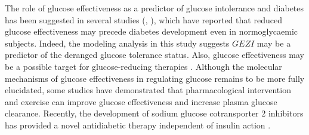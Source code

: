 \documentclass[utf8]{frontiersSCNS} %
\begin{document}
The role of glucose effectiveness as a predictor of glucose intolerance and diabetes has been suggested in several studies (\citet{Martin1992}, \citet{lorenzo_2010}), which have reported that reduced glucose effectiveness may precede diabetes development even in normoglycaemic subjects. Indeed, the modeling analysis in this study suggests $GEZI$ may be a predictor of the deranged glucose tolerance status. Also, glucose effectiveness may be a possible target for glucose-reducing therapies \citep{Ahren_2020}. Although the molecular mechanisms of glucose effectiveness in regulating glucose remains to be more fully elucidated, some studies have demonstrated that pharmacological intervention \citep{pau_2014} and exercise \citep{kar_2017} can improve glucose effectiveness and increase plasma glucose clearance. Recently, the development of sodium glucose cotransporter 2 inhibitors has provided a novel antidiabetic therapy independent of insulin action \citep{SGLT2_2015}. %
\end{document}
